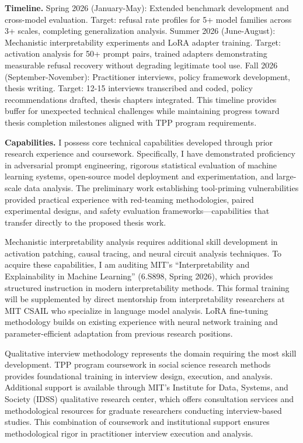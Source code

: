 \documentclass[10pt]{article}
\begin{document}
\textbf{Timeline.} Spring 2026 (January-May): Extended benchmark development and cross-model evaluation. Target: refusal rate profiles for 5+ model families across 3+ scales, completing generalization analysis. Summer 2026 (June-August): Mechanistic interpretability experiments and LoRA adapter training. Target: activation analysis for 50+ prompt pairs, trained adapters demonstrating measurable refusal recovery without degrading legitimate tool use. Fall 2026 (September-November): Practitioner interviews, policy framework development, thesis writing. Target: 12-15 interviews transcribed and coded, policy recommendations drafted, thesis chapters integrated. This timeline provides buffer for unexpected technical challenges while maintaining progress toward thesis completion milestones aligned with TPP program requirements.

\textbf{Capabilities.} I possess core technical capabilities developed through prior research experience and coursework. Specifically, I have demonstrated proficiency in adversarial prompt engineering, rigorous statistical evaluation of machine learning systems, open-source model deployment and experimentation, and large-scale data analysis. The preliminary work establishing tool-priming vulnerabilities provided practical experience with red-teaming methodologies, paired experimental designs, and safety evaluation frameworks—capabilities that transfer directly to the proposed thesis work.

Mechanistic interpretability analysis requires additional skill development in activation patching, causal tracing, and neural circuit analysis techniques. To acquire these capabilities, I am auditing MIT's ``Interpretability and Explainability in Machine Learning'' (6.S898, Spring 2026), which provides structured instruction in modern interpretability methods. This formal training will be supplemented by direct mentorship from interpretability researchers at MIT CSAIL who specialize in language model analysis. LoRA fine-tuning methodology builds on existing experience with neural network training and parameter-efficient adaptation from previous research positions.

Qualitative interview methodology represents the domain requiring the most skill development. TPP program coursework in social science research methods provides foundational training in interview design, execution, and analysis. Additional support is available through MIT's Institute for Data, Systems, and Society (IDSS) qualitative research center, which offers consultation services and methodological resources for graduate researchers conducting interview-based studies. This combination of coursework and institutional support ensures methodological rigor in practitioner interview execution and analysis.
\end{document}
